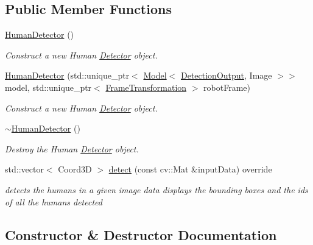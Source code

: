 \subsection*{Public Member Functions}
\begin{DoxyCompactItemize}
\item 
\mbox{\label{classHumanDetector_adbdfd2cfc3579f254de16aba058cab06}} 
\hyperlink{classHumanDetector_adbdfd2cfc3579f254de16aba058cab06}{Human\+Detector} ()
\begin{DoxyCompactList}\small\item\em Construct a new Human \hyperlink{classDetector}{Detector} object. \end{DoxyCompactList}\item 
\hyperlink{classHumanDetector_ad24009d2c6d212e037ee2ae46a9b9c05}{Human\+Detector} (std\+::unique\+\_\+ptr$<$ \hyperlink{classModel}{Model}$<$ \hyperlink{classData}{Detection\+Output}, Image $>$$>$ model, std\+::unique\+\_\+ptr$<$ \hyperlink{classFrameTransformation}{Frame\+Transformation} $>$ robot\+Frame)
\begin{DoxyCompactList}\small\item\em Construct a new Human \hyperlink{classDetector}{Detector} object. \end{DoxyCompactList}\item 
\mbox{\label{classHumanDetector_a14a3f12c65510640240522c9e064b5f6}} 
\hyperlink{classHumanDetector_a14a3f12c65510640240522c9e064b5f6}{$\sim$\+Human\+Detector} ()
\begin{DoxyCompactList}\small\item\em Destroy the Human \hyperlink{classDetector}{Detector} object. \end{DoxyCompactList}\item 
std\+::vector$<$ Coord3D $>$ \hyperlink{classHumanDetector_a3883a91447922d9b4bfc8ade8281f947}{detect} (const cv\+::\+Mat \&input\+Data) override
\begin{DoxyCompactList}\small\item\em detects the humans in a given image data displays the bounding boxes and the ids of all the humans detected \end{DoxyCompactList}\end{DoxyCompactItemize}


\subsection{Constructor \& Destructor Documentation}
\mbox{\label{classHumanDetector_ad24009d2c6d212e037ee2ae46a9b9c05}} 
